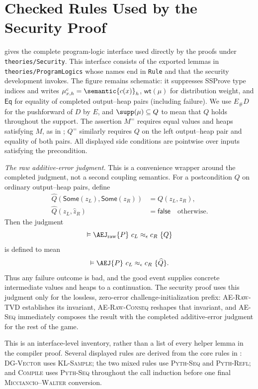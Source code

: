 \section{Checked Rules Used by the Security Proof}
\label{app:checked-rules}

 gives the complete program-logic interface
used directly by the proofs under \texttt{theories/Security}.
This interface consists of the exported lemmas in
\texttt{theories/ProgramLogics} whose names end in \texttt{Rule} and that the
security development invokes.
The figure remains schematic: it suppresses SSProve type indices and writes
\(\mu^c_{x,h}=\semantic{c(x)}_h\), \(\mathsf{wt}(\mu)\) for distribution
weight, and \(\mathsf{Eq}\) for equality of completed output--heap pairs
(including failure).
We use \(E_\#D\) for the pushforward of \(D\) by \(E\), and
\(\supp(\mu)\subseteq Q\) to mean that \(Q\) holds throughout the support.
The assertion \(M^{=}\) requires equal values and heaps satisfying \(M\), as
in ; \(Q^{=}\) similarly requires \(Q\) on the left
output--heap pair and equality of both pairs.
All displayed side conditions are pointwise over inputs satisfying the
precondition.

\smallskip\noindent\emph{The raw additive-error judgment.}
This is a convenience wrapper around the completed judgment, not a second
coupling semantics.
For a postcondition \(Q\) on ordinary output--heap pairs, define
\[
 \begin{aligned}
 \widehat Q(\mathsf{Some}(z_L),\mathsf{Some}(z_R))
   &=Q(z_L,z_R),\\
 \widehat Q(\widehat z_L,\widehat z_R)
   &=\mathsf{false}\quad\text{otherwise}.
 \end{aligned}
\]
Then the judgment
\[
 \vDash\AEJ_{\rm raw}\{P\}\ c_L\approx_\epsilon c_R\ \{Q\}
\]
is defined to mean
\[
 \vDash\AEJ\{P\}\ c_L\approx_\epsilon c_R\ \{\widehat Q\}.
\]
Thus any failure outcome is bad, and the good event supplies concrete
intermediate values and heaps to a continuation.
The security proof uses this judgment only for the lossless, zero-error
challenge-initialization prefix: \textsc{AE-Raw-TVD} establishes its invariant,
\textsc{AE-Raw-Conseq} reshapes that invariant, and \textsc{AE-Seq} immediately
composes the result with the completed additive-error judgment for the rest of
the game.

This is an interface-level inventory, rather than a list of every helper
lemma in the compiler proof.
Several displayed rules are derived from the core rules in
: \textsc{DG-Vector} uses \textsc{KL-Sample}; the two
mixed rules use \textsc{Pyth-Seq} and \textsc{Pyth-Refl}; and
\textsc{Compile} uses \textsc{Pyth-Seq} throughout the call induction before
one final \textsc{Micciancio--Walter} conversion.

